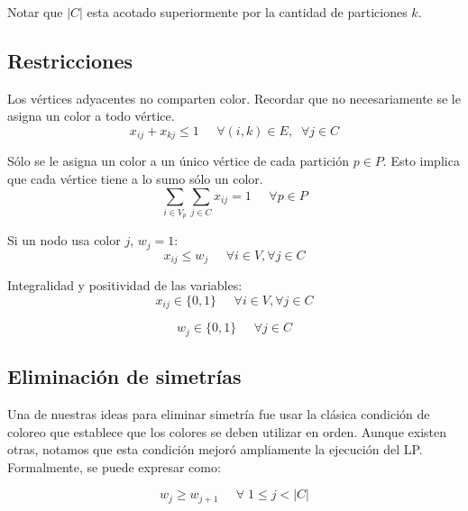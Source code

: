 Notar que $|C|$ esta acotado superiormente por la cantidad de particiones $k$.

\vspace{10px}

\subsection{Restricciones}
\label{restricciones}

Los vértices adyacentes no comparten color. Recordar que no necesariamente se le asigna un color a todo vértice.
\begin{equation}
x_{ij} + x_{kj} \leq 1 \;\;\;\;\; \forall (i,k) \in E,\;\; \forall j \in C
\end{equation}

Sólo se le asigna un color a un único vértice de cada partición $p \in P$. Esto implica que cada vértice tiene a lo sumo sólo un color.
\begin{equation}
\sum_{i \in V_p} \sum_{j \in C} x_{ij} = 1 \;\;\;\;\; \forall p \in P
\end{equation}

Si un nodo usa color $j$, $w_j = 1$:
\begin{equation}
x_{ij} \leq w_j \;\;\;\;\; \forall i \in V, \forall j \in C
\end{equation}

Integralidad y positividad de las variables:
\begin{equation}
x_{ij} \in \{0,1\} \;\;\;\;\; \forall i \in V, \forall j \in C
\end{equation}

\begin{equation}
w_j \in \{0,1\} \;\;\;\;\; \forall j \in C
\end{equation}

\subsection{Eliminación de simetrías}
\label{simetria}

Una de nuestras ideas para eliminar simetría fue usar la clásica condición de coloreo que establece que los colores se deben utilizar en orden. Aunque existen otras, notamos que esta condición mejoró ampliamente la ejecución del LP. Formalmente, se puede expresar como:

\begin{equation}
w_j \geq w_{j+1} \;\;\;\;\; \forall \; 1 \leq j < |C|
\end{equation}
